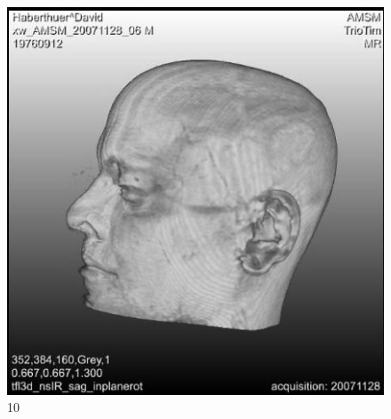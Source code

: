 \documentclass{article}
\begin{document}
\begin{figure}
	\centering
	\includegraphics[width=0.618\linewidth]{scalebarimage}
	\caption{10}
\end{figure}
\clearpage
\end{document}
